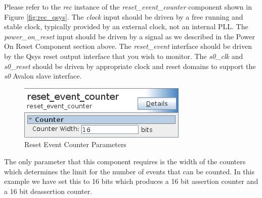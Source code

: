 \documentclass{article}
\begin{document}
\begin{flushleft}
Please refer to the \emph{rec} instance of the \emph{reset\_event\_counter} component shown in Figure \ref{fig:rec_qsys}.  The \emph{clock} input should be driven by a free running and stable clock, typically provided by an external clock, not an internal PLL.  The \emph{power\_on\_reset} input should be driven by a signal as we described in the Power On Reset Component section above.  The \emph{reset\_event} interface should be driven by the Qsys reset output interface that you wish to monitor.  The \emph{s0\_clk} and \emph{s0\_reset} should be driven by appropriate clock and reset domains to support the \emph{s0} Avalon slave interface.

\begin{figure}[H]
\centering
\includegraphics[scale=0.675]{rec_parameters}
\caption{Reset Event Counter Parameters}
\label{fig:rec_parameters}
\end{figure}

The only parameter that this component requires is the width of the counters which determines the limit for the number of events that can be counted.  In this example we have set this to 16 bits which produces a 16 bit assertion counter and a 16 bit deassertion counter.

\end{flushleft}

\end{document}

